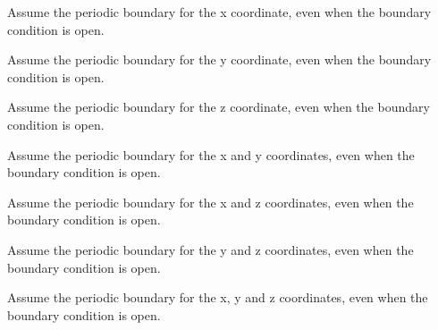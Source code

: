 Assume the periodic boundary for the x coordinate, even when the
boundary condition is open.



Assume the periodic boundary for the y coordinate, even when the
boundary condition is open.




Assume the periodic boundary for the z coordinate, even when the
boundary condition is open.



Assume the periodic boundary for the x and y coordinates, even when the
boundary condition is open.



Assume the periodic boundary for the x and z coordinates, even when the
boundary condition is open.



Assume the periodic boundary for the y and z coordinates, even when the
boundary condition is open.



Assume the periodic boundary for the x, y and z coordinates, even when the
boundary condition is open.

